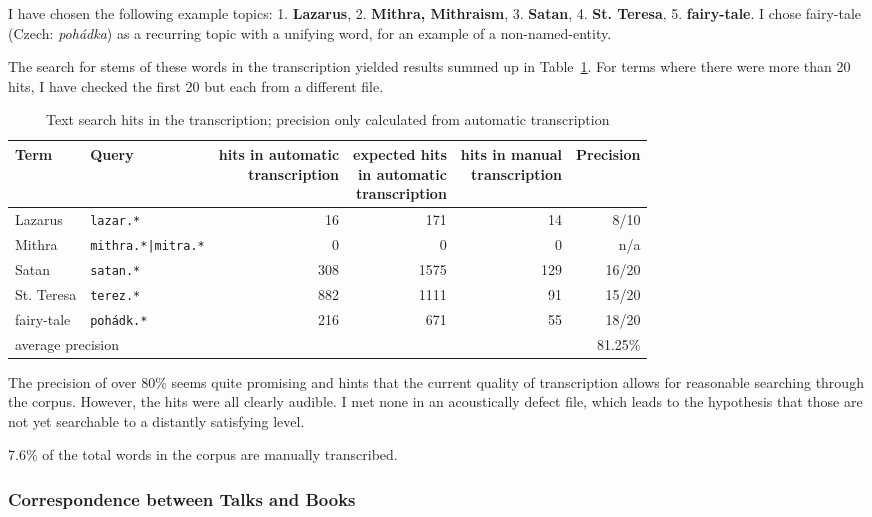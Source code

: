 \documentclass[a4paper,11pt]{article}
\begin{document}
I have chosen the following example topics:
1. \textbf{Lazarus},
2. \textbf{Mithra, Mithraism},
3. \textbf{Satan},
4. \textbf{St. Teresa},
5. \textbf{fairy-tale}.
I chose fairy-tale (Czech: \emph{poh\'{a}dka}) as a recurring topic with a
unifying word, for an example of a non-named-entity.

The search for stems of these words in the transcription
yielded results summed up in Table~\ref{tab:topicsearch}. For terms where there
were more than 20 hits, I have checked the first 20 but each from a different
file.

\begin{table}[htpb]
\begin{center}
\begin{tabular}{|l|l|r|r|r|r|}
\hline
Term &
Query &
\makecell{hits in automatic\\
transcription} &
\makecell{expected hits\\
in automatic\\
transcription} &
\makecell{hits in manual\\
transcription} &
Precision \\
\hline
Lazarus & \texttt{lazar.*} & 16 & 171 & 14 & 8/10   \\
Mithra & \texttt{mithra.*|mitra.*} & 0 & 0 & 0 & n/a   \\
Satan & \texttt{satan.*} & 308 & 1575 & 129 & 16/20   \\
St. Teresa & \texttt{terez.*} & 882 & 1111 & 91 & 15/20   \\
fairy-tale & \texttt{pohádk.*} & 216 & 671 & 55 & 18/20   \\
\hline
\multicolumn{5}{|l|}{average precision} & 81.25\%\\
\hline
\end{tabular}
\caption{Text search hits in the transcription; precision only calculated from
automatic transcription}\label{tab:topicsearch}
\end{center}
\end{table}

The precision of over 80\% seems quite promising and hints that the current
quality of transcription allows for reasonable searching through the corpus.
However, the hits were all clearly audible. I met none in an acoustically defect
file, which leads to the hypothesis that those are not yet searchable to a
distantly satisfying level.

7.6\% of the total words in the corpus are manually transcribed. 

\subsubsection{Correspondence between Talks and Books}
\end{document}
